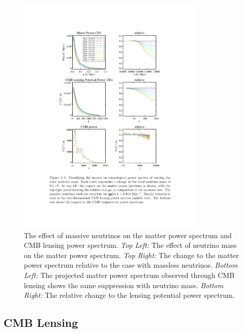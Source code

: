 \begin{figure}[t]
\begin{center}
\includegraphics[width = 0.8\textwidth]{Neutrinos/MatterLensingMnu.pdf} 
\caption{ The effect of massive neutrinos on the matter power spectrum and CMB lensing power spectrum.  {\it Top Left:} The effect of neutrino mass on the matter power spectrum. {\it Top Right:} The change to the matter power spectrum relative to the case with massless neutrinos. {\it Bottom Left:} The projected matter power spectrum observed through CMB lensing shows the same suppression with neutrino mass. {\it Bottom Right:} The relative change to the lensing potential power spectrum.} %
\label{fig:lensingsuppression}
\end{center}
\end{figure} 


\subsection{CMB Lensing}\label{sec:neulens}

